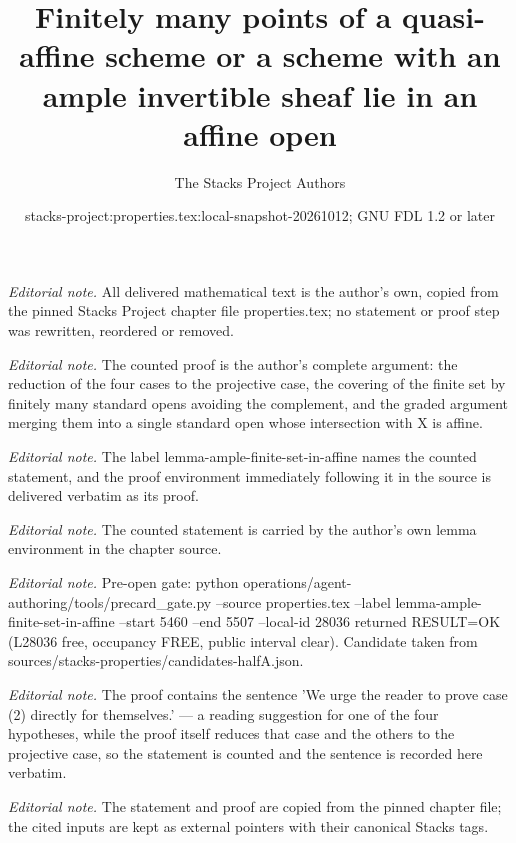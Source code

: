 \documentclass[10pt,a4paper]{amsart}
\title{Finitely many points of a quasi-affine scheme or a scheme with an ample invertible sheaf lie in an affine open}
\author{The Stacks Project Authors}
\date{stacks-project:properties.tex:local-snapshot-20261012; GNU FDL 1.2 or later}
\theoremstyle{plain}
\theoremstyle{definition}
\theoremstyle{remark}
\numberwithin{equation}{subsection}
\begin{document}
\maketitle
\noindent\textit{Editorial note.} All delivered mathematical text is the author's own, copied from the pinned Stacks Project chapter file properties.tex; no statement or proof step was rewritten, reordered or removed.\par\medskip
\noindent\textit{Editorial note.} The counted proof is the author's complete argument: the reduction of the four cases to the projective case, the covering of the finite set by finitely many standard opens avoiding the complement, and the graded argument merging them into a single standard open whose intersection with X is affine.\par\medskip
\noindent\textit{Editorial note.} The label lemma-ample-finite-set-in-affine names the counted statement, and the proof environment immediately following it in the source is delivered verbatim as its proof.\par\medskip
\noindent\textit{Editorial note.} The counted statement is carried by the author's own lemma environment in the chapter source.\par\medskip
\noindent\textit{Editorial note.} Pre-open gate: python operations/agent-authoring/tools/precard\_gate.py --source properties.tex --label lemma-ample-finite-set-in-affine --start 5460 --end 5507 --local-id 28036 returned RESULT=OK (L28036 free, occupancy FREE, public interval clear). Candidate taken from sources/stacks-properties/candidates-halfA.json.\par\medskip
\noindent\textit{Editorial note.} The proof contains the sentence 'We urge the reader to prove case (2) directly for themselves.' — a reading suggestion for one of the four hypotheses, while the proof itself reduces that case and the others to the projective case, so the statement is counted and the sentence is recorded here verbatim.\par\medskip
\noindent\textit{Editorial note.} The statement and proof are copied from the pinned chapter file; the cited inputs are kept as external pointers with their canonical Stacks tags.\par\medskip
\end{document}
